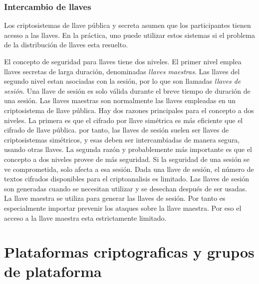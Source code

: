 \documentclass[12pt]{article}
\theoremstyle{definition}
\begin{document}
\subsubsection{Intercambio de llaves}
Los criptosistemas de llave pública y secreta asumen que los participantes tienen acesso a las llaves. En la práctica, uno puede utilizar estos sistemas si el problema de la distribución de llaves esta resuelto.

El concepto de seguridad para llaves tiene dos niveles. El primer nivel emplea llaves secretas de larga duración, denominadas \textit{llaves maestras}. Las llaves del segundo nivel estan asociadas con la sesión, por lo que son llamadas \textit{llaves de sesión}. Una llave de sesión es solo válida durante el breve tiempo de duración de una sesión. Las llaves maestras son normalmente las llaves empleadas en un criptosistema de llave pública.
\newline
\newline
Hay dos razones principales para el concepto a dos niveles. La primera es que el cifrado por llave simétrica es más eficiente que el cifrado de llave pública. por tanto, las llaves de sesión suelen ser llaves de criptosistemas simétricos, y esas deben ser intercambiadas de manera segura, usando otras llaves. La segunda razón y probablemente más importante es que el concepto a dos niveles provee de más seguridad. Si la seguridad de una sesión se ve comprometida, solo afecta a esa sesión. Dada una llave de sesión, el número de textos cifrados disponibles para el criptoanalisis es limitado. Las llaves de sesión son generadas cuando se necesitan utilizar y se desechan después de ser usadas.
\newline
\newline
La llave maestra se utiliza para generar las llaves de sesión. Por tanto es especialmente importar prevenir los ataques sobre la llave maestra. Por eso el acceso a la llave maestra esta estrictamente limitado.





















\section{Plataformas criptograficas y grupos de plataforma}
\end{document}
